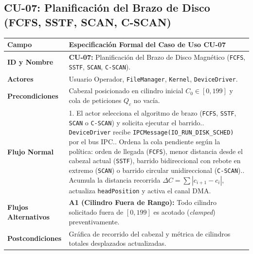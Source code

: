\documentclass[10pt,twocolumn,letterpaper]{article}
\begin{document}
\subsection{CU-07: Planificaci\'on del Brazo de Disco (FCFS, SSTF, SCAN, C-SCAN)}
\begin{table}[!htb]
\centering
\scriptsize
\renewcommand{\arraystretch}{1.12}
\begin{tabularx}{\columnwidth}{L{2.1cm} Y}
\toprule
\textbf{Campo} & \textbf{Especificaci\'on Formal del Caso de Uso CU-07} \\
\midrule
\textbf{ID y Nombre} & \textbf{CU-07:} Planificaci\'on del Brazo de Disco Magn\'etico (\texttt{FCFS}, \texttt{SSTF}, \texttt{SCAN}, \texttt{C-SCAN}). \\
\textbf{Actores} & Usuario Operador, \texttt{FileManager}, \texttt{Kernel}, \texttt{DeviceDriver}. \\
\textbf{Precondiciones} & Cabezal posicionado en cilindro inicial $C_0 \in [0, 199]$ y cola de peticiones $Q_c$ no vac\'ia. \\
\textbf{Flujo Normal} & 1. El actor selecciona el algoritmo de brazo (\texttt{FCFS}, \texttt{SSTF}, \texttt{SCAN} o \texttt{C-SCAN}) y solicita ejecutar el barrido.. \texttt{DeviceDriver} recibe \texttt{IPCMessage(IO\_RUN\_DISK\_SCHED)} por el bus IPC.. Ordena la cola pendiente seg\'un la pol\'itica: orden de llegada (\texttt{FCFS}), menor distancia desde el cabezal actual (\texttt{SSTF}), barrido bidireccional con rebote en extremo (\texttt{SCAN}) o barrido circular unidireccional (\texttt{C-SCAN}).. Acumula la distancia recorrida $\Delta C = \sum |c_{i+1} - c_i|$, actualiza \texttt{headPosition} y activa el canal DMA. \\
\textbf{Flujos Alternativos} & \textbf{A1 (Cilindro Fuera de Rango):} Todo cilindro solicitado fuera de $[0, 199]$ es acotado (\textit{clamped}) preventivamente. \\
\textbf{Postcondiciones} & Gr\'afica de recorrido del cabezal y m\'etrica de cilindros totales desplazados actualizadas. \\
\bottomrule
\end{tabularx}
\end{table}
\end{document}
